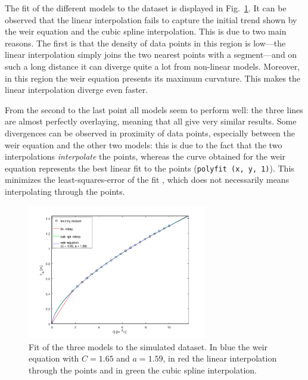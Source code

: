 The fit of the different models to the dataset is displayed in Fig.~\ref{fig:fitting_results}.
It can be observed that the linear interpolation fails to capture the initial trend shown by the weir equation and the cubic spline interpolation.
This is due to two main reasons.
The first is that the density of data points in this region is low---the linear interpolation simply joins the two nearest points with a segment---and on such a long distance it can diverge quite a lot from non-linear models.
Moreover, in this region the weir equation presents its maximum curvature.
This makes the linear interpolation diverge even faster.

From the second to the last point all models seem to perform well: the three lines are almost perfectly overlaying, meaning that all give very similar results.
Some divergences can be observed in proximity of data points, especially between the weir equation and the other two models: this is due to the fact that the two interpolations \emph{interpolate} the points, whereas the curve obtained for the weir equation represents the best linear fit to the points (\texttt{polyfit (x, y, 1)}).
This minimizes the least-squares-error of the fit \autocite{eaton_gnu_2016}, which does not necessarily means interpolating through the points.

\begin{figure}[h]
  \centering
  \includegraphics[width=0.7\textwidth]{Figures/fitting_results.png}
  \caption{Fit of the three models to the simulated dataset. In blue the weir equation with $C = \num{1.65}$ and $a = \num{1.59}$, in red the linear interpolation through the points and in green the cubic spline interpolation.}
  \label{fig:fitting_results}
\end{figure}

